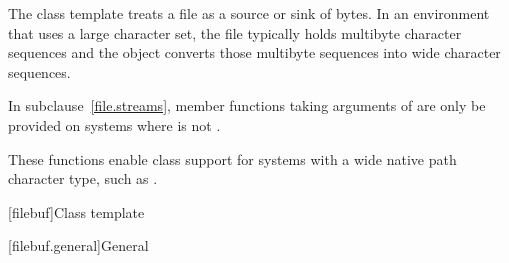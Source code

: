 \pnum
\begin{note}
The class template  treats a file as a source or
sink of bytes. In an environment that uses a large character set, the file
typically holds multibyte character sequences and the 
object converts those multibyte sequences into wide character sequences.
\end{note}

\pnum
In subclause~\ref{file.streams}, member functions taking arguments of 
are only be provided on systems where  is not .
\begin{note}
These functions enable class  support for systems with a wide native path character type, such as .
\end{note}

[filebuf]{Class template }

[filebuf.general]{General}

